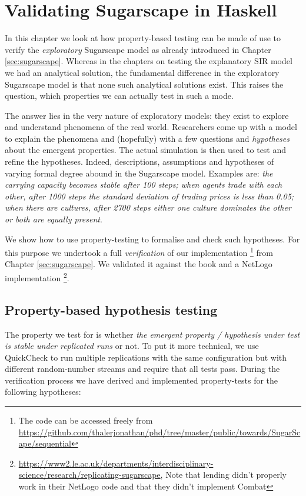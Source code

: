 \chapter{Validating Sugarscape in Haskell}
\label{app:validating_sugarscape}

In this chapter we look at how property-based testing can be made of use to verify the \textit{exploratory} Sugarscape model \cite{epstein_growing_1996} as already introduced in Chapter \ref{sec:sugarscape}. Whereas in the chapters on testing the explanatory SIR model we had an analytical solution, the fundamental difference in the exploratory Sugarscape model is that none such analytical solutions exist. This raises the question, which properties we can actually test in such a mode.

The answer lies in the very nature of exploratory models: they exist to explore and understand phenomena of the real world. Researchers come up with a model to explain the phenomena and (hopefully) with a few questions and \textit{hypotheses} about the emergent properties. The actual simulation is then used to test and refine the hypotheses. Indeed, descriptions, assumptions and hypotheses of varying formal degree abound in the Sugarscape model. Examples are: \textit{the carrying capacity becomes stable after 100 steps; when agents trade with each other, after 1000 steps the standard deviation of trading prices is less than 0.05; when there are cultures, after 2700 steps either one culture dominates the other or both are equally present}. 

We show how to use property-testing to formalise and check such hypotheses. For this purpose we undertook a full \textit{verification} of our implementation \footnote{The code can be accessed freely from \url{https://github.com/thalerjonathan/phd/tree/master/public/towards/SugarScape/sequential}} from Chapter \ref{sec:sugarscape}. We validated it against the book \cite{epstein_growing_1996} and a NetLogo implementation \cite{weaver_replicating_2009} \footnote{\url{https://www2.le.ac.uk/departments/interdisciplinary-science/research/replicating-sugarscape}, Note that lending didn't properly work in their NetLogo code and that they didn't implement Combat}. 

\section{Property-based hypothesis testing}
The property we test for is whether \textit{the emergent property / hypothesis under test is stable under replicated runs} or not. To put it more technical, we use QuickCheck to run multiple replications with the same configuration but with different random-number streams and require that all tests pass. During the verification process we have derived and implemented property-tests for the following hypotheses:

